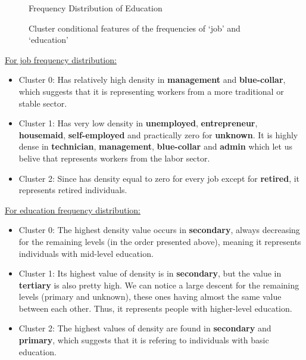 \documentclass[12pt]{article}
\begin{document}
\begin{enumerate}
\begin{enumerate}[label=\alph*)]
\begin{figure}[h]
\begin{minipage}{0.43\textwidth}
                \caption{Frequency Distribution of Education}
            \end{minipage}
            \caption{Cluster conditional features of the frequencies of `job' and `education'}
        \end{figure}

        \newpage
        \underline{For job frequency distribution:}

        \begin{itemize}
            \item Cluster 0: Has relatively high density in \textbf{management} and \textbf{blue-collar}, which suggests that it is representing workers from a more traditional or stable sector.
            
            \item Cluster 1: Has very low density in \textbf{unemployed}, \textbf{entrepreneur}, \textbf{housemaid}, \textbf{self-employed} and practically zero for \textbf{unknown}. It is highly dense in \textbf{technician}, \textbf{management}, \textbf{blue-collar} and \textbf{admin} which let us belive that represents workers from the labor sector.
            
            \item Cluster 2: Since has density equal to zero for every job except for \textbf{retired}, it represents retired individuals.
        \end{itemize}

        \vspace{10pt}
        \underline{For education frequency distribution:}
        
        \begin{itemize}
            \item Cluster 0: The highest density value occurs in \textbf{secondary}, always decreasing for the remaining levels 
            (in the order presented above), meaning it represents individuals with mid-level education.
            
            \item Cluster 1: Its highest value of density is in \textbf{secondary}, but the value in \textbf{tertiary} is also pretty high. 
            We can notice a large descent for the remaining levels (primary and unknown), these ones having almost the same value 
            between each other. Thus, it represents people with higher-level education.
            
            \item Cluster 2: The highest values of density are found in \textbf{secondary} and \textbf{primary}, which suggests that it is 
            refering to individuals with basic education.
        \end{itemize}
        

\end{enumerate}
\end{enumerate}
\end{document}
